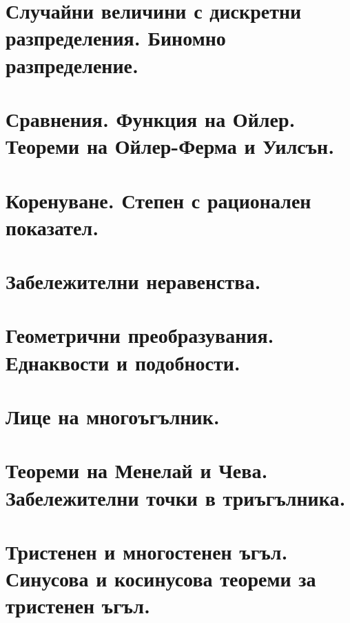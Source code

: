\chapter{Случайни величини с дискретни разпределения. Биномно разпределение.}

\chapter{Сравнения. Функция на Ойлер. Теореми на Ойлер-Ферма и Уилсън.}

\chapter{Коренуване. Степен с рационален показател.}

\chapter{Забележителни неравенства.}

\chapter{Геометрични преобразувания. Еднаквости и подобности.}

\chapter{Лице на многоъгълник.}

\chapter{Теореми на Менелай и Чева. Забележителни точки в триъгълника.}

\chapter{Тристенен и многостенен ъгъл. Синусова и косинусова теореми за тристенен ъгъл.}
